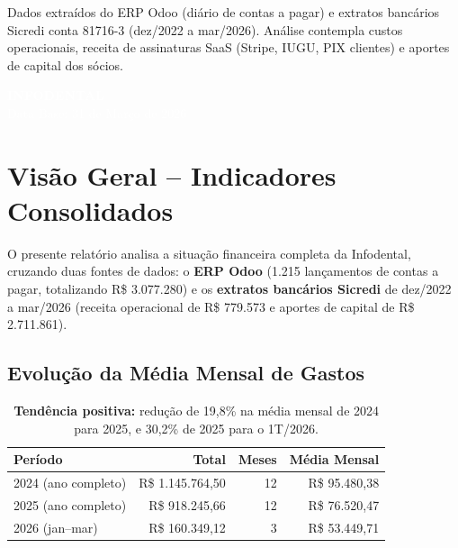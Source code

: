 \documentclass[12pt, a4paper]{article}
\newcommand{\reais}[1]{R\$ #1}
\begin{document}
\begin{titlepage}
    \vfill
    {\small Dados extraídos do ERP Odoo (diário de contas a pagar) e extratos bancários Sicredi conta 81716-3 (dez/2022 a mar/2026). Análise contempla custos operacionais, receita de assinaturas SaaS (Stripe, IUGU, PIX clientes) e aportes de capital dos sócios.} \\
    \vspace{1.5cm}

    \colorbox{primaryColor}{%
        \parbox{0.9\textwidth}{%
            \centering
            \vspace{0.5cm}
            \textcolor{white}{\Large \textbf{INFODENTAL}} \\
            \vspace{0.2cm}
            \textcolor{white}{\normalsize Data Base: 31 de Março de 2026} \\
            \vspace{0.5cm}
        }%
    }
\end{titlepage}

\section{Visão Geral -- Indicadores Consolidados}

O presente relatório analisa a situação financeira completa da Infodental, cruzando duas fontes de dados: o \textbf{ERP Odoo} (1.215 lançamentos de contas a pagar, totalizando R\$ 3.077.280) e os \textbf{extratos bancários Sicredi} de dez/2022 a mar/2026 (receita operacional de R\$ 779.573 e aportes de capital de R\$ 2.711.861).

\subsection{Evolução da Média Mensal de Gastos}

\begin{table}[H]
    \centering
    \renewcommand{\arraystretch}{1.4}
    \begin{tabularx}{\textwidth}{X r r r}
        \toprule
        \rowcolor{tableHeader} \textbf{Período} & \textbf{Total} & \textbf{Meses} & \textbf{Média Mensal} \\
        \midrule
        2024 (ano completo) & \reais{1.145.764,50} & 12 & \reais{95.480,38} \\
        2025 (ano completo) & \reais{918.245,66} & 12 & \reais{76.520,47} \\
        \rowcolor{successGreen!15} 2026 (jan--mar) & \reais{160.349,12} & 3 & \reais{53.449,71} \\
        \bottomrule
    \end{tabularx}
    \caption*{\footnotesize \textcolor{successGreen}{\textbf{Tendência positiva:}} redução de 19,8\% na média mensal de 2024 para 2025, e 30,2\% de 2025 para o 1T/2026.}
\end{table}
\end{document}

